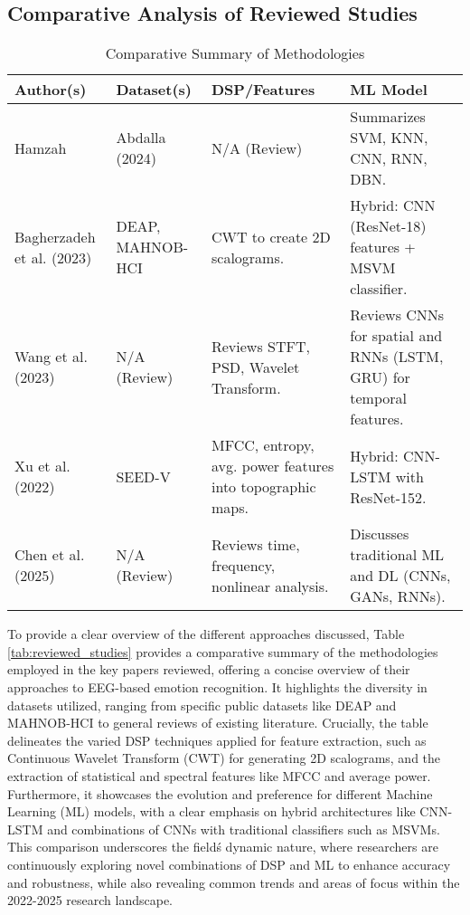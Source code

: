 \documentclass[conference]{IEEEtran}
\begin{document}
\subsection{Comparative Analysis of Reviewed Studies}
\begin{table}[htbp]
\caption{Comparative Summary of Methodologies}
\begin{center}
\begin{tabular}{|p{1.3cm}|p{1.3cm}|p{2.3cm}|p{2.3cm}|}
\hline
\textbf{Author(s)} & \textbf{Dataset(s)} & \textbf{DSP/Features} & \textbf{ML Model} \\
\hline
Hamzah & Abdalla (2024) \cite{b1} & N/A (Review) & Summarizes SVM, KNN, CNN, RNN, DBN. \\
\hline
Bagherzadeh et al. (2023) \cite{b2} & DEAP, MAHNOB-HCI & CWT to create 2D scalograms. & Hybrid: CNN (ResNet-18) features + MSVM classifier. \\
\hline
Wang et al. (2023) \cite{b3} & N/A (Review) & Reviews STFT, PSD, Wavelet Transform. & Reviews CNNs for spatial and RNNs (LSTM, GRU) for temporal features. \\
\hline
Xu et al. (2022) \cite{b4} & SEED-V & MFCC, entropy, avg. power features into topographic maps. & Hybrid: CNN-LSTM with ResNet-152. \\
\hline
Chen et al. (2025) \cite{b5} & N/A (Review) & Reviews time, frequency, nonlinear analysis. & Discusses traditional ML and DL (CNNs, GANs, RNNs). \\
\hline
\end{tabular}
\end{center}
\end{table}
To provide a clear overview of the different approaches discussed, Table \ref{tab:reviewed_studies} provides a comparative summary of the methodologies employed in the key papers reviewed, offering a concise overview of their approaches to EEG-based emotion recognition. It highlights the diversity in datasets utilized, ranging from specific public datasets like DEAP and MAHNOB-HCI to general reviews of existing literature. Crucially, the table delineates the varied DSP techniques applied for feature extraction, such as Continuous Wavelet Transform (CWT) for generating 2D scalograms, and the extraction of statistical and spectral features like MFCC and average power. Furthermore, it showcases the evolution and preference for different Machine Learning (ML) models, with a clear emphasis on hybrid architectures like CNN-LSTM and combinations of CNNs with traditional classifiers such as MSVMs. This comparison underscores the field\'s dynamic nature, where researchers are continuously exploring novel combinations of DSP and ML to enhance accuracy and robustness, while also revealing common trends and areas of focus within the 2022-2025 research landscape.
\end{document}

